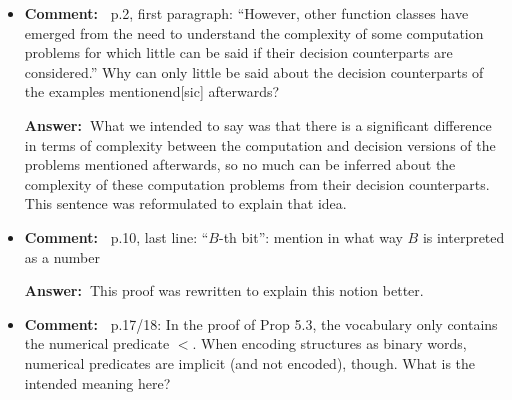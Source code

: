 \documentclass[a4paper]{article}
\newcommand{\ans}{{\bf Answer:\ }}
\newcommand{\cm}[1]{{\bf Comment:\ } #1}
\begin{document}
\begin{itemize}
	\setlength\itemsep{0.5em}
	\item \cm{p.2, first paragraph: ``However, other function classes have emerged from the need to understand	the complexity of some computation problems for which little can be said if their decision counterparts are considered.'' Why can only little be said about the decision counterparts of the examples mentionend[sic] afterwards?}
	
	\ans What we intended to say was that there is a significant difference in terms of complexity between the computation and decision versions of the problems mentioned afterwards, so no much can be inferred about the complexity of these computation problems from their decision counterparts. This sentence was reformulated to explain that idea.
	
	\item \cm{p.10, last line: ``$B$-th bit'': mention in what way $B$ is interpreted as a number}
	
	\ans This proof was rewritten to explain this notion better.
	
	\item \cm{p.17/18: In the proof of Prop 5.3, the vocabulary only contains the numerical predicate $<$. When encoding structures as binary words, numerical predicates are implicit (and not encoded), though. What is the intended meaning here?}
	

\end{itemize}
\end{document}
